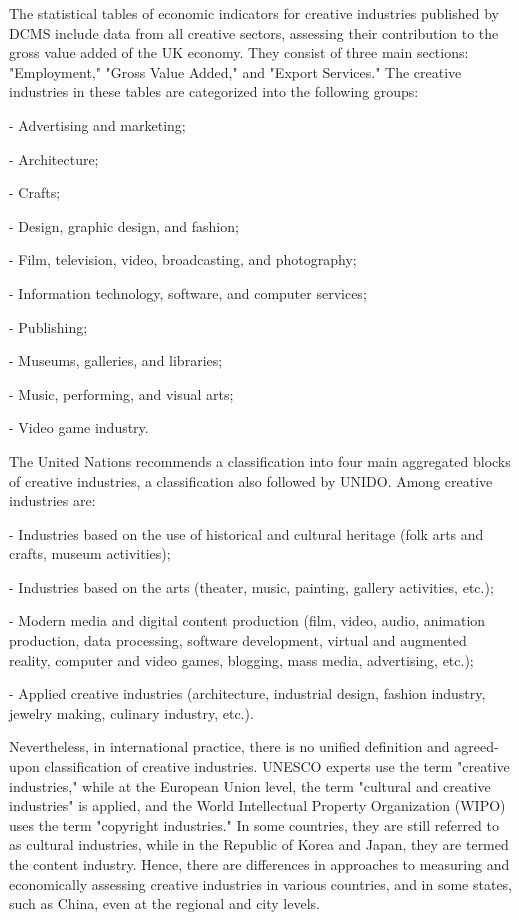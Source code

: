 The statistical tables of economic indicators for creative industries
published by DCMS include data from all creative sectors, assessing
their contribution to the gross value added of the UK economy. They
consist of three main sections: "Employment," "Gross Value Added," and
"Export Services." The creative industries in these tables are
categorized into the following groups:

- Advertising and marketing;

- Architecture;

- Crafts;

- Design, graphic design, and fashion;

- Film, television, video, broadcasting, and photography;

- Information technology, software, and computer services;

- Publishing;

- Museums, galleries, and libraries;

- Music, performing, and visual arts;

- Video game industry.

The United Nations recommends a classification into four main aggregated
blocks of creative industries, a classification also followed by UNIDO.
Among creative industries are:

- Industries based on the use of historical and cultural heritage (folk
arts and crafts, museum activities);

- Industries based on the arts (theater, music, painting, gallery
activities, etc.);

- Modern media and digital content production (film, video, audio,
animation production, data processing, software development, virtual and
augmented reality, computer and video games, blogging, mass media,
advertising, etc.);

- Applied creative industries (architecture, industrial design, fashion
industry, jewelry making, culinary industry, etc.).

Nevertheless, in international practice, there is no unified definition
and agreed-upon classification of creative industries. UNESCO experts
use the term "creative industries," while at the European Union level,
the term "cultural and creative industries" is applied, and the World
Intellectual Property Organization (WIPO) uses the term "copyright
industries." In some countries, they are still referred to as cultural
industries, while in the Republic of Korea and Japan, they are termed
the content industry. Hence, there are differences in approaches to
measuring and economically assessing creative industries in various
countries, and in some states, such as China, even at the regional and
city levels.

